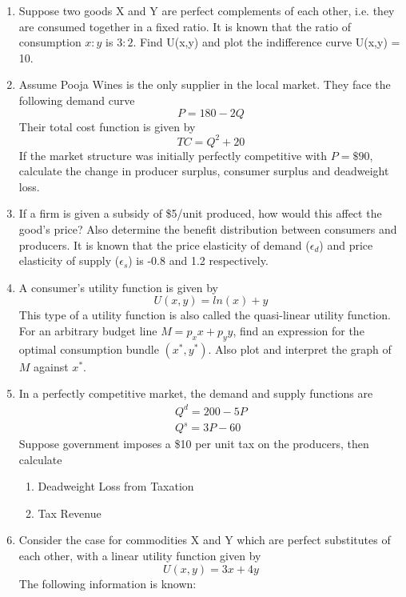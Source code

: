 \documentclass{article}
\begin{document}
\begin{enumerate}
        Determine the profit-maximizing output level of each plant and equilibrium price. 
    \item 
        Suppose two goods X and Y are perfect complements of each other, i.e. they are consumed together in a fixed ratio. It is known that the ratio of consumption $x:y$ is $3:2$. Find U(x,y) and plot the indifference curve U(x,y) = 10.
    \item 
        Assume Pooja Wines is the only supplier in the local market. They face the following demand curve
        \[
        P=180-2Q
        \]
        Their total cost function is given by 
        \[
        TC=Q^2+20
        \]
        If the market structure was initially perfectly competitive with $P=\$90$, calculate the change in producer surplus, consumer surplus and deadweight loss.
    \item 
        If a firm is given a subsidy of \$5/unit produced, how would this affect the good's price? Also determine the benefit distribution between consumers and producers. It is known that the price elasticity of demand ($\epsilon_d$) and price elasticity of supply ($\epsilon_s$) is -0.8 and 1.2 respectively. 
    \item 
        A consumer's utility function is given by 
        \[
        U(x,y) = ln(x)+y
        \]
        This type of a utility function is also called the quasi-linear utility function. For an arbitrary budget line $M=p_xx+p_yy$, find an expression for the optimal consumption bundle $(x^*,y^*)$. Also plot and interpret the graph of $M$ against $x^*$.
    \item 
        In a perfectly competitive market, the demand and supply functions are
        \begin{align}
            Q^d = 200-5P \tag{1} \\
            Q^s = 3P-60 \tag{2} 
        \end{align}
        Suppose government imposes a \$10 per unit tax on the producers, then calculate 
        \begin{enumerate}[label=(\roman*)]
            \item Deadweight Loss from Taxation
            \item Tax Revenue
        \end{enumerate}
    \item 
        Consider the case for commodities X and Y which are perfect substitutes of each other, with a linear utility function given by
        \[
        U(x,y) = 3x+4y 
        \]
        The following information is known:

\end{enumerate}
\end{document}
